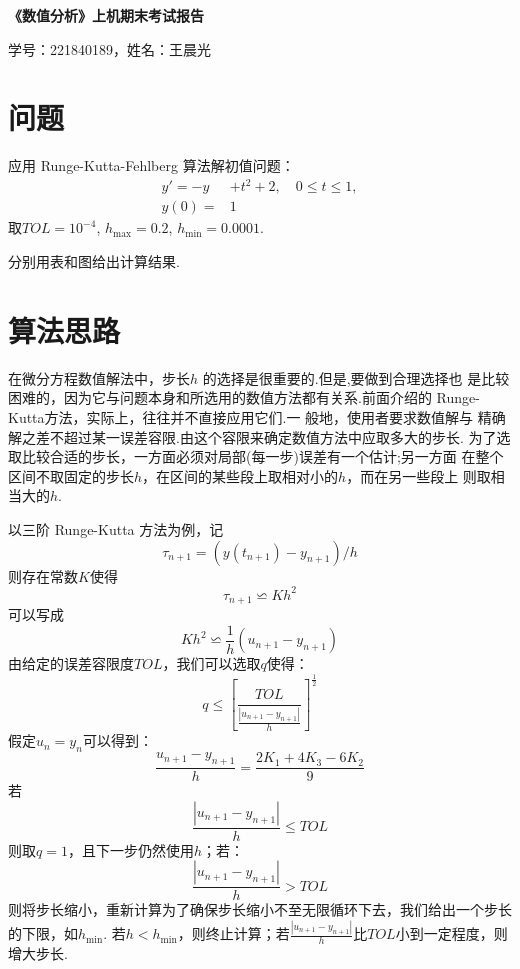 \documentclass[UTF8,ctexart,a4paper,11pt,openany]{article}
\theoremstyle{definition}
\begin{document}
\begin{center}
{\huge \textbf{《数值分析》上机期末考试报告}}

{\large 学号：221840189，姓名：王晨光}
\end{center}

\section{问题}
    应用 Runge-Kutta-Fehlberg 算法解初值问题：$$\begin{aligned}
        y' =  -y&+t^2+2, \quad 0\le t\le 1, \\
        y(0) = & 1
    \end{aligned}$$
    取$TOL=10^{-4}$, $h_{\text{max}}=0.2$, $h_{\text{min}}=0.0001$.\par 分别用表和图给出计算结果. 
\section{算法思路}
    在微分方程数值解法中，步长$h$ 的选择是很重要的.但是,要做到合理选择也 
    是比较困难的，因为它与问题本身和所选用的数值方法都有关系.前面介绍的 
    Runge-Kutta方法，实际上，往往并不直接应用它们.一 般地，使用者要求数值解与 
    精确解之差不超过某一误差容限.由这个容限来确定数值方法中应取多大的步长. 
    为了选取比较合适的步长，一方面必须对局部(每一步)误差有一个估计;另一方面 
    在整个区间不取固定的步长$h$，在区间的某些段上取相对小的$h$，而在另一些段上 
    则取相当大的$h$. \par
    以三阶 Runge-Kutta 方法为例，记$$\tau_{n+1}=(y(t_{n+1})-y_{n+1})/h$$则存在常数$K$使得$$\tau _{n+1}\backsimeq Kh^2$$可以写成$$Kh^2\backsimeq \frac{1}{h}(u_{n+1}-y_{n+1})$$由给定的误差容限度$TOL$，我们可以选取$q$使得：$$q\leqslant \left[\frac{TOL}{\frac{|u_{n+1}-y_{n+1}|}{h}}\right]^{\frac{1}{2}}$$假定$u_n=y_n$可以得到：$$\frac{u_{n+1}-y_{n+1}}{h}=\frac{2K_1+4K_3-6K_2}{9}$$\indent 若$$\frac{\left|u_{n+1}-y_{n+1}\right|}{h}\leqslant TOL$$则取$q=1$，且下一步仍然使用$h$；若：$$\frac{\left|u_{n+1}-y_{n+1}\right|}{h}> TOL$$则将步长缩小，重新计算为了确保步长缩小不至无限循环下去，我们给出一个步长的下限，如$h_{\text{min}}$. 若$h<h_{\text{min}}$，则终止计算；若$\frac{\left|u_{n+1}-y_{n+1}\right|}{h}$比$TOL$小到一定程度，则增大步长. \par
\end{document}
